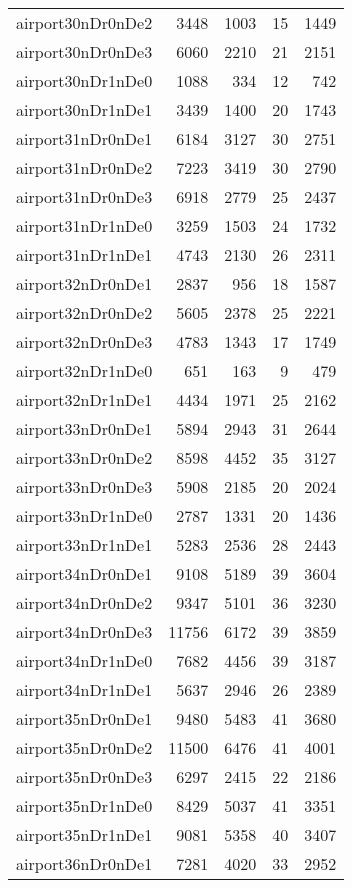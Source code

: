\begin{longtable}{lrrrr}
airport30nDr0nDe2 & 3448 & 1003 & 15 & 1449 \\
airport30nDr0nDe3 & 6060 & 2210 & 21 & 2151 \\
airport30nDr1nDe0 & 1088 & 334 & 12 & 742 \\
airport30nDr1nDe1 & 3439 & 1400 & 20 & 1743 \\
airport31nDr0nDe1 & 6184 & 3127 & 30 & 2751 \\
airport31nDr0nDe2 & 7223 & 3419 & 30 & 2790 \\
airport31nDr0nDe3 & 6918 & 2779 & 25 & 2437 \\
airport31nDr1nDe0 & 3259 & 1503 & 24 & 1732 \\
airport31nDr1nDe1 & 4743 & 2130 & 26 & 2311 \\
airport32nDr0nDe1 & 2837 & 956 & 18 & 1587 \\
airport32nDr0nDe2 & 5605 & 2378 & 25 & 2221 \\
airport32nDr0nDe3 & 4783 & 1343 & 17 & 1749 \\
airport32nDr1nDe0 & 651 & 163 & 9 & 479 \\
airport32nDr1nDe1 & 4434 & 1971 & 25 & 2162 \\
airport33nDr0nDe1 & 5894 & 2943 & 31 & 2644 \\
airport33nDr0nDe2 & 8598 & 4452 & 35 & 3127 \\
airport33nDr0nDe3 & 5908 & 2185 & 20 & 2024 \\
airport33nDr1nDe0 & 2787 & 1331 & 20 & 1436 \\
airport33nDr1nDe1 & 5283 & 2536 & 28 & 2443 \\
airport34nDr0nDe1 & 9108 & 5189 & 39 & 3604 \\
airport34nDr0nDe2 & 9347 & 5101 & 36 & 3230 \\
airport34nDr0nDe3 & 11756 & 6172 & 39 & 3859 \\
airport34nDr1nDe0 & 7682 & 4456 & 39 & 3187 \\
airport34nDr1nDe1 & 5637 & 2946 & 26 & 2389 \\
airport35nDr0nDe1 & 9480 & 5483 & 41 & 3680 \\
airport35nDr0nDe2 & 11500 & 6476 & 41 & 4001 \\
airport35nDr0nDe3 & 6297 & 2415 & 22 & 2186 \\
airport35nDr1nDe0 & 8429 & 5037 & 41 & 3351 \\
airport35nDr1nDe1 & 9081 & 5358 & 40 & 3407 \\
airport36nDr0nDe1 & 7281 & 4020 & 33 & 2952 \\

\end{longtable}
